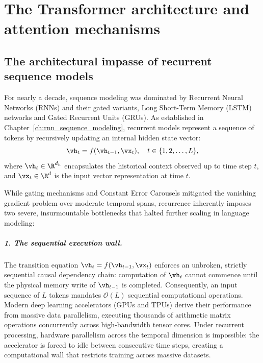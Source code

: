 \documentclass[../../main.tex]{subfiles}
\begin{document}
\chapter{The Transformer architecture and attention mechanisms}
\label{ch:transformer_architecture}

\section{The architectural impasse of recurrent sequence models}
\label{sec:recurrent_impasse}

For nearly a decade, sequence modeling was dominated by Recurrent Neural Networks (RNNs) and their gated variants, Long Short-Term Memory (LSTM) networks and Gated Recurrent Units (GRUs). As established in Chapter~\ref{ch:rnn_sequence_modeling}, recurrent models represent a sequence of tokens by recursively updating an internal hidden state vector:
\begin{equation}
\label{eq:recurrent_transition_step}
\vh_t = f(\vh_{t-1}, \vx_t), \quad t \in \{1, 2, \dots, L\},
\end{equation}
where $\vh_t \in \R^{d_h}$ encapsulates the historical context observed up to time step $t$, and $\vx_t \in \R^d$ is the input vector representation at time $t$.

While gating mechanisms and Constant Error Carousels mitigated the vanishing gradient problem over moderate temporal spans, recurrence inherently imposes two severe, insurmountable bottlenecks that halted further scaling in language modeling:

\paragraph{1. The sequential execution wall.}
The transition equation $\vh_t = f(\vh_{t-1}, \vx_t)$ enforces an unbroken, strictly sequential causal dependency chain: computation of $\vh_t$ cannot commence until the physical memory write of $\vh_{t-1}$ is completed. Consequently, an input sequence of $L$ tokens mandates $\mathcal{O}(L)$ sequential computational operations.
Modern deep learning accelerators (GPUs and TPUs) derive their performance from massive data parallelism, executing thousands of arithmetic matrix operations concurrently across high-bandwidth tensor cores. Under recurrent processing, hardware parallelism across the temporal dimension is impossible: the accelerator is forced to idle between consecutive time steps, creating a computational wall that restricts training across massive datasets.
\end{document}

